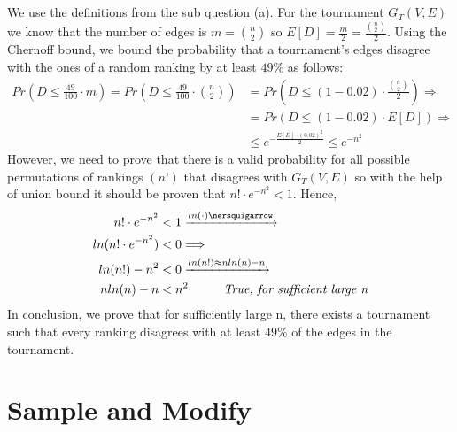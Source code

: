\documentclass[11pt]{537homework}
\begin{document}
\subsection{} 
We use the definitions from the sub question (a). For the tournament $G_{T}(V,E)$ we know that the number of edges is $m = {n \choose 2}$ so $E[D]= \frac{m}{2} = \frac{{n \choose 2}}{2}$. Using the Chernoff bound, we bound the probability that a tournament's edges disagree with the ones of a random ranking by at least $49\%$ as follows:
\begin{align*}
    Pr(D \leq \frac{49}{100} \cdot m) = Pr(D \leq \frac{49}{100} \cdot {n \choose 2}) &= Pr(D \leq (1-0.02) \cdot \frac{{n \choose 2}}{2}) \Longrightarrow \\
    &= Pr(D \leq (1-0.02) \cdot E[D]) \Longrightarrow \\
    &\leq e^{-\frac{E[D]\cdot (0.02)^2}{2}} \leq e^{-n^2} 
\end{align*}
However, we need to prove that there is a valid probability for all possible permutations of rankings $(n!)$ that disagrees with $G_{T}(V,E)$ so with the help of union bound it should be proven that $n! \cdot e^{-n^2} < 1$. Hence,
\begin{align*}
    n! \cdot e^{-n^2} &< 1 \xrightarrow{ln(\cdot) \nersquigarrow} \\
    ln(n! \cdot e^{-n^2}) &< 0 \Longrightarrow \\
    ln(n!) - n^2 &< 0 \xrightarrow{ln(n!) \approx nln(n) -n} \\
    nln(n) - n &< n^2 \hspace{1cm} \textit{True, for sufficient large n}
\end{align*}
In conclusion, we prove that for sufficiently large n, there exists a tournament such that every ranking disagrees with at least $49\%$ of the edges in the tournament.

\section{Sample and Modify}
\end{document}
